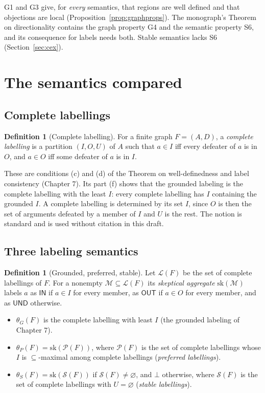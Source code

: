 \documentclass[11pt]{article}
\theoremstyle{plain}
\theoremstyle{definition}
\newtheorem{definition}[theorem]{Definition}
\theoremstyle{remark}
\newcommand{\IN}{\textsf{IN}}
\newcommand{\OUT}{\textsf{OUT}}
\newcommand{\UND}{\textsf{UND}}
\begin{document}
G1 and G3 give, for \emph{every} semantics, that regions are well defined and that objections are local (Proposition~\ref{prop:graphprops}). The monograph's Theorem on directionality contains the graph property G4 and the semantic property S6, and its consequence for labels needs both. Stable semantics lacks S6 (Section~\ref{sec:cex}).

\section{The semantics compared}\label{sec:defs}

\subsection{Complete labellings}

\begin{definition}[Complete labelling]\label{def:complete}
For a finite graph $F=(A,D)$, a \emph{complete labelling} is a partition $(I,O,U)$ of $A$ such that $a\in I$ iff every defeater of $a$ is in $O$, and $a\in O$ iff some defeater of $a$ is in $I$.
\end{definition}

These are conditions (c) and (d) of the Theorem on well-definedness and label consistency (Chapter 7). Its part (f) shows that the grounded labeling is the complete labelling with the least $I$: every complete labelling has $I$ containing the grounded $I$. A complete labelling is determined by its set $I$, since $O$ is then the set of arguments defeated by a member of $I$ and $U$ is the rest. The notion is standard and is used without citation in this draft.


\subsection{Three labeling semantics}

\begin{definition}[Grounded, preferred, stable]
Let $\mathcal L(F)$ be the set of complete labellings of $F$. For a nonempty $\mathcal M\subseteq\mathcal L(F)$ its \emph{skeptical aggregate} $\mathrm{sk}(\mathcal M)$ labels $a$ as $\IN$ if $a\in I$ for every member, as $\OUT$ if $a\in O$ for every member, and as $\UND$ otherwise.
\begin{itemize}[nosep]
\item $\theta_G(F)$ is the complete labelling with least $I$ (the grounded labeling of Chapter 7).
\item $\theta_P(F)=\mathrm{sk}(\mathcal P(F))$, where $\mathcal P(F)$ is the set of complete labellings whose $I$ is $\subseteq$-maximal among complete labellings (\emph{preferred labellings}).
\item $\theta_S(F)=\mathrm{sk}(\mathcal S(F))$ if $\mathcal S(F)\ne\varnothing$, and $\bot$ otherwise, where $\mathcal S(F)$ is the set of complete labellings with $U=\varnothing$ (\emph{stable labellings}).
\end{itemize}
\end{definition}
\end{document}
